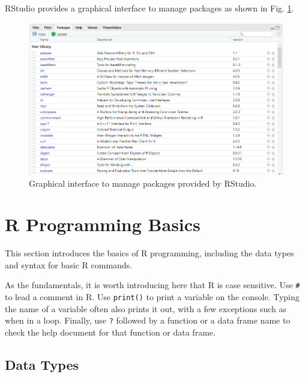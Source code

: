 RStudio provides a graphical interface to manage packages as shown in Fig. \ref{ch:r1:fig:rstudio_package_management}.
\begin{figure}
\centering
\includegraphics[width=350pt]{chapters/ch-r/figures/rstudio_package_management.png}
\caption{Graphical interface to manage packages provided by RStudio.} \label{ch:r1:fig:rstudio_package_management}
\end{figure}

\section{R Programming Basics} \label{ch:r1:sec:rprogramming}

This section introduces the basics of R programming, including the data types and syntax for basic R commands.

As the fundamentals, it is worth introducing here that R is case sensitive. Use \verb|#| to lead a comment in R. Use \verb|print()| to print a variable on the console. Typing the name of a variable often also prints it out, with a few exceptions such as when in a loop. Finally, use \verb|?| followed by a function or a data frame name to check the help document for that function or data frame.

\subsection{Data Types}

